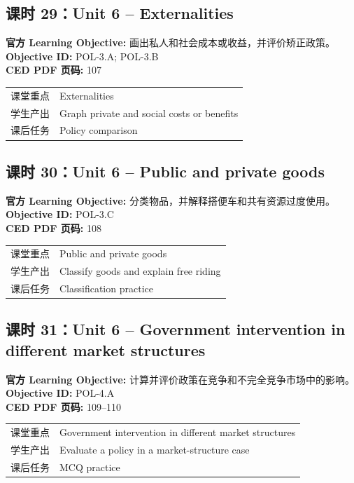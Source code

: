 \documentclass[11pt,a4paper]{ctexart}
\newcommand{\objectivebox}[1]{\noindent\colorbox{aplight}{\parbox{0.96\textwidth}{#1}}}
\begin{document}
\subsection{课时 29：Unit 6 -- Externalities}
\objectivebox{\textbf{官方 Learning Objective:} 画出私人和社会成本或收益，并评价矫正政策。\\\textbf{Objective ID:} POL-3.A; POL-3.B\\\textbf{CED PDF 页码:} 107}\par\vspace{0.4em}
\begin{tabularx}{\textwidth}{p{3.0cm}Y}
\toprule
课堂重点 & Externalities\\
学生产出 & Graph private and social costs or benefits\\
课后任务 & Policy comparison\\
\bottomrule
\end{tabularx}
\subsection{课时 30：Unit 6 -- Public and private goods}
\objectivebox{\textbf{官方 Learning Objective:} 分类物品，并解释搭便车和共有资源过度使用。\\\textbf{Objective ID:} POL-3.C\\\textbf{CED PDF 页码:} 108}\par\vspace{0.4em}
\begin{tabularx}{\textwidth}{p{3.0cm}Y}
\toprule
课堂重点 & Public and private goods\\
学生产出 & Classify goods and explain free riding\\
课后任务 & Classification practice\\
\bottomrule
\end{tabularx}
\newpage
\subsection{课时 31：Unit 6 -- Government intervention in different market structures}
\objectivebox{\textbf{官方 Learning Objective:} 计算并评价政策在竞争和不完全竞争市场中的影响。\\\textbf{Objective ID:} POL-4.A\\\textbf{CED PDF 页码:} 109–110}\par\vspace{0.4em}
\begin{tabularx}{\textwidth}{p{3.0cm}Y}
\toprule
课堂重点 & Government intervention in different market structures\\
学生产出 & Evaluate a policy in a market-structure case\\
课后任务 & MCQ practice\\
\bottomrule
\end{tabularx}
\end{document}
